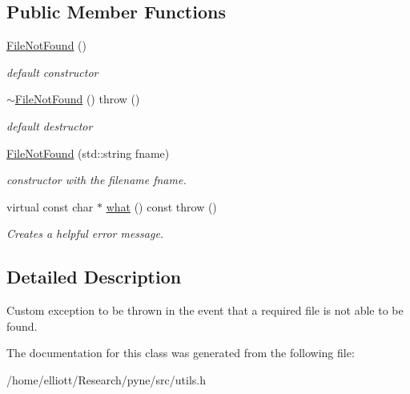 \subsection*{Public Member Functions}
\begin{DoxyCompactItemize}
\item 
\hypertarget{classpyne_1_1_file_not_found_aaae1bdf04df2b68377ae453929c8eb56}{\hyperlink{classpyne_1_1_file_not_found_aaae1bdf04df2b68377ae453929c8eb56}{File\-Not\-Found} ()}\label{classpyne_1_1_file_not_found_aaae1bdf04df2b68377ae453929c8eb56}

\begin{DoxyCompactList}\small\item\em default constructor \end{DoxyCompactList}\item 
\hypertarget{classpyne_1_1_file_not_found_abc00e9c8711bb1b1bb2dc1dfd3a98745}{\hyperlink{classpyne_1_1_file_not_found_abc00e9c8711bb1b1bb2dc1dfd3a98745}{$\sim$\-File\-Not\-Found} ()  throw ()}\label{classpyne_1_1_file_not_found_abc00e9c8711bb1b1bb2dc1dfd3a98745}

\begin{DoxyCompactList}\small\item\em default destructor \end{DoxyCompactList}\item 
\hypertarget{classpyne_1_1_file_not_found_a4d766115c01634b77aebe42269f9aead}{\hyperlink{classpyne_1_1_file_not_found_a4d766115c01634b77aebe42269f9aead}{File\-Not\-Found} (std\-::string fname)}\label{classpyne_1_1_file_not_found_a4d766115c01634b77aebe42269f9aead}

\begin{DoxyCompactList}\small\item\em constructor with the filename {\itshape fname}. \end{DoxyCompactList}\item 
\hypertarget{classpyne_1_1_file_not_found_a55d410139d5853e8988d073637845cbd}{virtual const char $\ast$ \hyperlink{classpyne_1_1_file_not_found_a55d410139d5853e8988d073637845cbd}{what} () const   throw ()}\label{classpyne_1_1_file_not_found_a55d410139d5853e8988d073637845cbd}

\begin{DoxyCompactList}\small\item\em Creates a helpful error message. \end{DoxyCompactList}\end{DoxyCompactItemize}


\subsection{Detailed Description}
Custom exception to be thrown in the event that a required file is not able to be found. 

The documentation for this class was generated from the following file\-:\begin{DoxyCompactItemize}
\item 
/home/elliott/\-Research/pyne/src/utils.\-h\end{DoxyCompactItemize}
